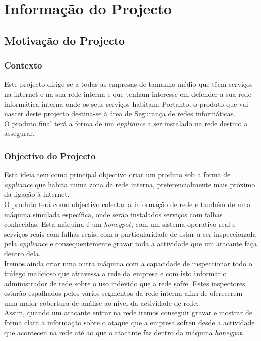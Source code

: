\chapter{Informação do Projecto}
\minitoc
\section{Motivação do Projecto}
\subsection{Contexto}
Este projecto dirige-se a todas as empresas de tamanho médio que têem serviços na internet e na sua rede interna e que
tenham interesse em defender a sua rede informática interna onde os seus serviços habitam.
Portanto, o produto que vai nascer deste projecto destina-se à área de Segurança de redes informáticas.\\
O produto final terá a forma de um \emph{appliance} a ser instalado na rede destino a assegurar.

\subsection{Objectivo do Projecto}
Esta ideia tem como principal objectivo criar um produto sob a forma de \emph{appliance}
que habita numa zona da rede interna, preferencialmente mais próximo da ligação à internet.\\
O produto terá como objectivo colectar a informação de rede e também de uma máquina simulada específica, onde serão instalados serviços com falhas conhecidas.
Esta máquina é um \emph{honeypot}, com um sistema operativo real e serviços reais com falhas reais, com a particularidade de estar a ser inspeccionada
pela \emph{appliance} e consequentemente gravar toda a actividade que um atacante faça dentro dela.\\
Iremos ainda criar uma outra máquina com a capacidade de inspeccionar todo o tráfego malicioso que atravessa a rede da empresa e com isto informar o
administrador de rede sobre o uso indevido que a rede sofre. Estes inspectores estarão espalhados pelos vários segmentos da rede interna afim de 
oferecerem uma maior cobertura de análise ao nível da actividade de rede.\\
Assim, quando um atacante entrar na rede iremos conseguir gravar e mostrar de forma clara a informação sobre o ataque que a empresa sofreu desde a actividade
que aconteceu na rede até ao que o atacante fez dentro da máquina \emph{honeypot}.\\

